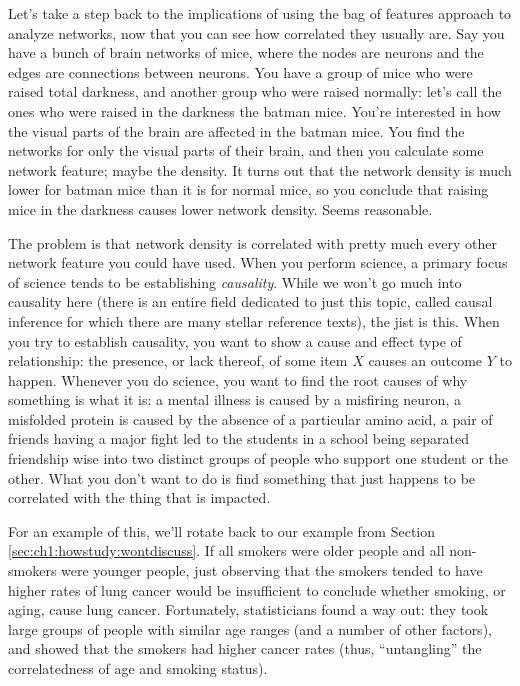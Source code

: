 Let's take a step back to the implications of using the bag of features approach to analyze networks, now that you can see how correlated they usually are. Say you have a bunch of brain networks of mice, where the nodes are neurons and the edges are connections between neurons. You have a group of mice who were raised total darkness, and another group who were raised normally: let's call the ones who were raised in the darkness the batman mice. You're interested in how the visual parts of the brain are affected in the batman mice. You find the networks for only the visual parts of their brain, and then you calculate some network feature; maybe the density. It turns out that the network density is much lower for batman mice than it is for normal mice, so you conclude that raising mice in the darkness causes lower network density. Seems reasonable.

The problem is that network density is correlated with pretty much every other network feature you could have used. When you perform science, a primary focus of science tends to be establishing \textit{causality}. While we won't go much into causality here (there is an entire field dedicated to just this topic, called {causal inference}  for which there are many stellar reference texts), the jist is this. When you try to establish causality, you want to show a cause and effect type of relationship: the presence, or lack thereof, of some item $X$ {causes} an outcome $Y$ to happen. Whenever you do science, you want to find the root causes of {why} something is what it is: a mental illness is caused by a misfiring neuron, a misfolded protein is caused by the absence of a particular amino acid, a pair of friends having a major fight led to the students in a school being separated friendship wise into two distinct groups of people who support one student or the other. What you don't want to do is find something that just happens to be {correlated} with the thing that is impacted. 

For an example of this, we'll rotate back to our example from Section \ref{sec:ch1:howstudy:wontdiscuss}. If all smokers were older people and all non-smokers were younger people, just observing that the smokers tended to have higher rates of lung cancer would be insufficient to conclude whether smoking, or aging, cause lung cancer. Fortunately, statisticians found a way out: they took large groups of people with similar age ranges (and a number of other factors), and showed that the smokers had higher cancer rates (thus, ``untangling'' the correlatedness of age and smoking status). 

